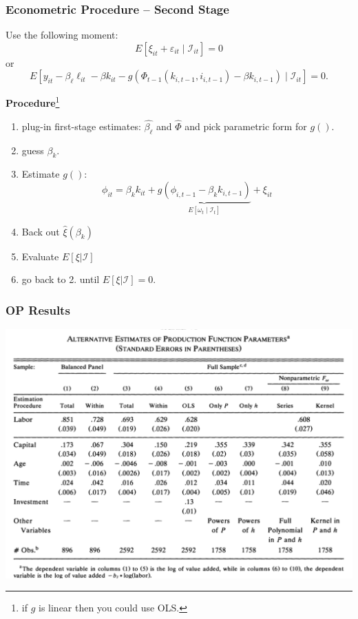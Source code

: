 \documentclass[11pt, aspectratio=169]{beamer}
\newenvironment{wideitemize}{\itemize\addtolength{\itemsep}{10pt}}{\enditemize}
\begin{document}
\begin{frame}[c]\frametitle{Econometric Procedure -- Second Stage}
    
\begin{wideitemize}
	\item Use the following moment:
	$$E[\xi_{it} + \varepsilon_{it} \mid \mathcal{I}_{it}] = 0$$
	or 
	$$E[y_{it} - \beta_{\ell} \ell_{it} - \beta k_{it} - g(\Phi_{t-1}(k_{i,t-1},i_{i,t-1})-\beta k_{i,t-1}) \mid \mathcal{I}_{it}] = 0.$$
\end{wideitemize}

\bigskip
\textbf{Procedure}\footnote{if $g$ is linear then you could use OLS.}

\begin{enumerate}
	\item plug-in first-stage estimates: $\hat{\beta_{\ell}}$ and $\hat{\Phi}$ and pick parametric form for $g()$.
	\item guess $\beta_k$.
	\item Estimate $g()$: 
	$$ \phi_{it} = \beta_k k_{it} + \underbrace{g(\phi_{i,t-1} - \beta_k k_{i,t-1})}_{E[\omega_t \mid \mathcal{I}_t]} + \xi_{it}$$
	\item Back out $\hat{\xi}(\beta_k)$
	\item Evaluate $E[\xi|\mathcal{I}]$
	\item go back to 2. until $E[\xi|\mathcal{I}]=0$.
\end{enumerate}

\end{frame}



\begin{frame}[c]\frametitle{OP Results}
    
\centering
\includegraphics[height=0.9\textheight]{OPTable6.png}


\end{frame}
\end{document}
